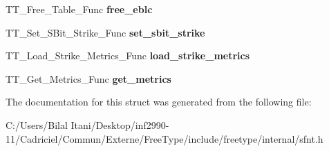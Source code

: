 \begin{DoxyCompactItemize}
\item 
T\+T\+\_\+\+Free\+\_\+\+Table\+\_\+\+Func {\bfseries free\+\_\+eblc}\hypertarget{struct_s_f_n_t___interface___a043a22a8dd45b30dc6e8e5cb7be8dc44}{}\label{struct_s_f_n_t___interface___a043a22a8dd45b30dc6e8e5cb7be8dc44}

\item 
T\+T\+\_\+\+Set\+\_\+\+S\+Bit\+\_\+\+Strike\+\_\+\+Func {\bfseries set\+\_\+sbit\+\_\+strike}\hypertarget{struct_s_f_n_t___interface___ab9e73d79753ea4a492c1cf66aee8e518}{}\label{struct_s_f_n_t___interface___ab9e73d79753ea4a492c1cf66aee8e518}

\item 
T\+T\+\_\+\+Load\+\_\+\+Strike\+\_\+\+Metrics\+\_\+\+Func {\bfseries load\+\_\+strike\+\_\+metrics}\hypertarget{struct_s_f_n_t___interface___a285149d0d4f00f2b862e3db45205cfa0}{}\label{struct_s_f_n_t___interface___a285149d0d4f00f2b862e3db45205cfa0}

\item 
T\+T\+\_\+\+Get\+\_\+\+Metrics\+\_\+\+Func {\bfseries get\+\_\+metrics}\hypertarget{struct_s_f_n_t___interface___a32ceff5842782c1cf7d7992e40cc858e}{}\label{struct_s_f_n_t___interface___a32ceff5842782c1cf7d7992e40cc858e}

\end{DoxyCompactItemize}


The documentation for this struct was generated from the following file\+:\begin{DoxyCompactItemize}
\item 
C\+:/\+Users/\+Bilal Itani/\+Desktop/inf2990-\/11/\+Cadriciel/\+Commun/\+Externe/\+Free\+Type/include/freetype/internal/sfnt.\+h\end{DoxyCompactItemize}
